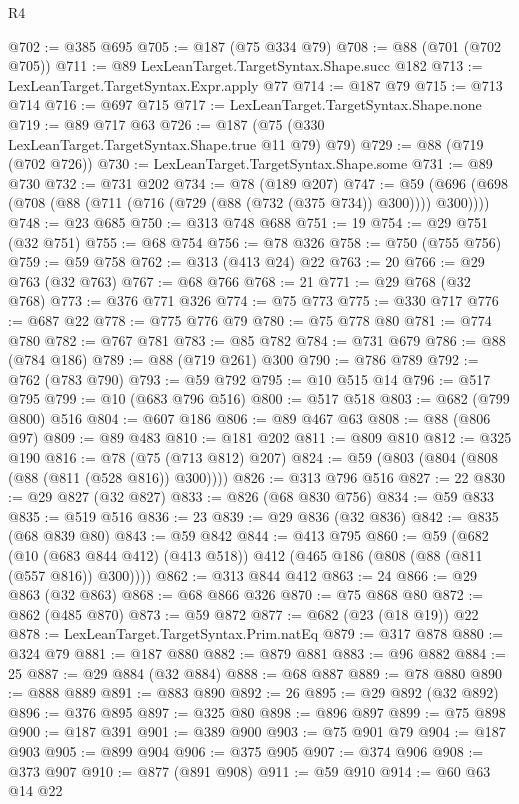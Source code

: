 \begin{lexlean}{R4}
\begin{coremodule}
{{{{{{{{{{{{{{{{{{{{{{{{{{{{{{{{{{{{{{{{{{{{{{{{{{{{{{{{{{{{{{{{{{{{{{{{{{{{{{{{{{{{{{{{{{{{@702 := @385 @695
@705 := @187 (@75 @334 @79)
@708 := @88 (@701 (@702 @705))
@711 := @89 LexLeanTarget.TargetSyntax.Shape.succ @182
@713 := LexLeanTarget.TargetSyntax.Expr.apply @77
@714 := @187 @79
@715 := @713 @714
@716 := @697 @715
@717 := LexLeanTarget.TargetSyntax.Shape.none
@719 := @89 @717 @63
@726 := @187 (@75 (@330 LexLeanTarget.TargetSyntax.Shape.true @11 @79) @79)
@729 := @88 (@719 (@702 @726))
@730 := LexLeanTarget.TargetSyntax.Shape.some
@731 := @89 @730
@732 := @731 @202
@734 := @78 (@189 @207)
@747 := @59 (@696 (@698 (@708 (@88 (@711 (@716 (@729 (@88 (@732 (@375 @734)) @300)))) @300))))
@748 := @23 @685
@750 := @313 @748 @688
@751 := 19
@754 := @29 @751 (@32 @751)
@755 := @68 @754
@756 := @78 @326
@758 := @750 (@755 @756)
@759 := @59 @758
@762 := @313 (@413 @24) @22
@763 := 20
@766 := @29 @763 (@32 @763)
@767 := @68 @766
@768 := 21
@771 := @29 @768 (@32 @768)
@773 := @376 @771 @326
@774 := @75 @773
@775 := @330 @717
@776 := @687 @22
@778 := @775 @776 @79
@780 := @75 @778 @80
@781 := @774 @780
@782 := @767 @781
@783 := @85 @782
@784 := @731 @679
@786 := @88 (@784 @186)
@789 := @88 (@719 @261) @300
@790 := @786 @789
@792 := @762 (@783 @790)
@793 := @59 @792
@795 := @10 @515 @14
@796 := @517 @795
@799 := @10 (@683 @796 @516)
@800 := @517 @518
@803 := @682 (@799 @800) @516
@804 := @607 @186
@806 := @89 @467 @63
@808 := @88 (@806 @97)
@809 := @89 @483
@810 := @181 @202
@811 := @809 @810
@812 := @325 @190
@816 := @78 (@75 (@713 @812) @207)
@824 := @59 (@803 (@804 (@808 (@88 (@811 (@528 @816)) @300))))
@826 := @313 @796 @516
@827 := 22
@830 := @29 @827 (@32 @827)
@833 := @826 (@68 @830 @756)
@834 := @59 @833
@835 := @519 @516
@836 := 23
@839 := @29 @836 (@32 @836)
@842 := @835 (@68 @839 @80)
@843 := @59 @842
@844 := @413 @795
@860 := @59
    (@682 (@10 (@683 @844 @412) (@413 @518)) @412 (@465 @186 (@808 (@88 (@811 (@557 @816)) @300))))
@862 := @313 @844 @412
@863 := 24
@866 := @29 @863 (@32 @863)
@868 := @68 @866 @326
@870 := @75 @868 @80
@872 := @862 (@485 @870)
@873 := @59 @872
@877 := @682 (@23 (@18 @19)) @22
@878 := LexLeanTarget.TargetSyntax.Prim.natEq
@879 := @317 @878
@880 := @324 @79
@881 := @187 @880
@882 := @879 @881
@883 := @96 @882
@884 := 25
@887 := @29 @884 (@32 @884)
@888 := @68 @887
@889 := @78 @880
@890 := @888 @889
@891 := @883 @890
@892 := 26
@895 := @29 @892 (@32 @892)
@896 := @376 @895
@897 := @325 @80
@898 := @896 @897
@899 := @75 @898
@900 := @187 @391
@901 := @389 @900
@903 := @75 @901 @79
@904 := @187 @903
@905 := @899 @904
@906 := @375 @905
@907 := @374 @906
@908 := @373 @907
@910 := @877 (@891 @908)
@911 := @59 @910
@914 := @60 @63 @14 @22
}}}}}}}}}}}}}}}}}}}}}}}}}}}}}}}}}}}}}}}}}}}}}}}}}}}}}}}}}}}}}}}}}}}}}}}}}}}}}}}}}}}}}}}}}}}}
\end{coremodule}
\end{lexlean}
